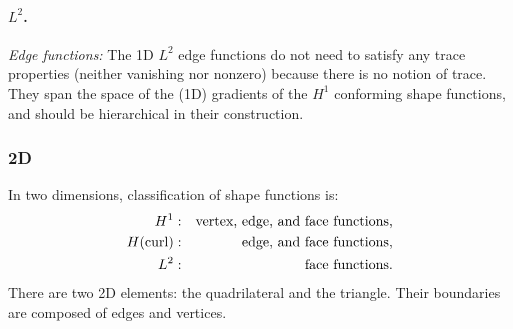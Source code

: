 \paragraph{$L^2$.}
\textit{Edge functions:}
The 1D $L^2$ edge functions do not need to satisfy any trace properties (neither vanishing nor nonzero) because there is no notion of trace.
They span the space of the (1D) gradients of the $H^1$ conforming shape functions, and should be hierarchical in their construction.

\subsubsection{2D}

In two dimensions, classification of shape functions is:
\begin{align*}
  	H^1:&\quad\text{vertex, edge, and face functions,}\\
  	H(\mathrm{curl}):&\quad\text{\phantom{vertex,} edge, and face functions,}\\
  	L^2:&\quad\text{\phantom{vertex, edge, and} face functions.}
\end{align*}
There are two 2D elements: the quadrilateral and the triangle.
Their boundaries are composed of edges and vertices.

